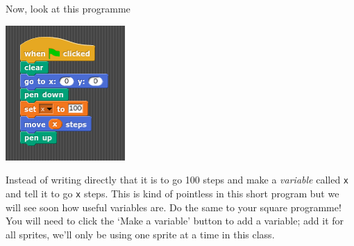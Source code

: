 \documentclass[11pt,a4paper]{scrartcl}
\begin{document}
Now, look at this programme
\begin{center}
\includegraphics{variable.png}
\end{center}
Instead of writing directly that it is to go 100 steps and make a
\textsl{variable} called \texttt{x} and tell it to go \texttt{x}
steps. This is kind of pointless in this short program but we will see
soon how useful variables are. Do the same to your square programme!
You will need to click the \lq{}Make a variable\rq{} button to add a
variable; add it for all sprites, we'll only be using one sprite at a
time in this class.
\end{document}
